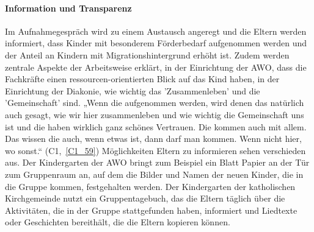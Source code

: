 \paragraph{Information und Transparenz}
Im Aufnahmegespräch wird zu einem Austausch angeregt und die Eltern werden informiert, dass Kinder mit besonderem Förderbedarf aufgenommen werden und der Anteil an Kindern mit Migrationshintergrund erhöht ist. Zudem werden zentrale Aspekte der Arbeitsweise erklärt, in der Einrichtung der AWO, dass die Fachkräfte einen ressourcen-orientierten Blick auf das Kind haben, in der Einrichtung der Diakonie, wie wichtig das 'Zusammenleben' und die 'Gemeinschaft' sind. „Wenn die aufgenommen werden, wird denen das natürlich auch gesagt, wie wir hier zusammenleben und wie wichtig die Gemeinschaft uns ist und die haben wirklich ganz schönes Vertrauen. Die kommen auch mit allem. Das wissen die auch, wenn etwas ist, dann darf man kommen. Wenn nicht hier, wo sonst.“ (C1,~\ref{C1_59})
Möglichkeiten Eltern zu informieren sehen verschieden aus. Der Kindergarten der AWO bringt zum Beispiel ein Blatt Papier an der Tür zum Gruppenraum an, auf dem die Bilder und Namen der neuen Kinder, die in die Gruppe kommen, festgehalten werden.
Der Kindergarten der katholischen Kirchgemeinde nutzt ein Gruppentagebuch, das die Eltern täglich über die Aktivitäten, die in der Gruppe stattgefunden haben, informiert und Liedtexte oder Geschichten bereithält, die die Eltern kopieren können. 

